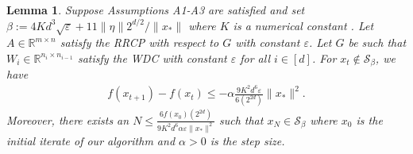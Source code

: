 \documentclass[11pt]{article}
\renewcommand{\epsilon}{\varepsilon}
\newcommand{\R}{\mathbb{R}}
\newcommand{\al}{\alpha}
\newcommand{\G}{G}
\newtheorem{lem}{Lemma}
\theoremstyle{remark}
\begin{document}
\begin{lem} \label{conv_to_neighborhoods_lemma} Suppose Assumptions A1-A3 are satisfied and set $\beta:= 4Kd^3\sqrt{\epsilon} + 11\|\eta\|2^{d/2}/\|x_*\|$ where $K$ is a numerical constant . Let $A \in \R^{m \times n}$ satisfy the RRCP with respect to $\G$ with constant $\epsilon$. Let $\G$ be such that $W_{i} \in \R^{n_i \times n_{i-1}}$ satisfy the WDC with constant $\epsilon$ for all $i \in [d]$. For $x_t \notin \mathcal{S}_{\beta}$, we have \begin{align*}
    f(x_{t+1}) - f(x_t)  \leqslant -\al \frac{9K^2d^6\epsilon}{6 (2^{2d})}\|x_*\|^2.
\end{align*} Moreover, there exists an $N \leqslant \frac{6f(x_0)(2^{2d})}{9K^2d^6 \al \epsilon \|x_*\|^2}$ such that $x_N \in \mathcal{S}_{\beta}$ where $x_0$ is the initial iterate of our algorithm and $\al > 0$ is the step size.
\end{lem}
\end{document}
